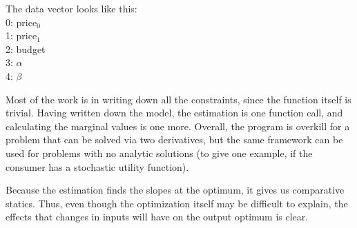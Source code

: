 The data vector looks like this:\\
0:  price$_0$\\
1:  price$_1$\\
2:  budget \\
3:  $\alpha$  \\
4:  $\beta$   
                                                             
Most of the work is in writing down all the constraints, since the
function itself is trivial. Having written down the model, the estimation
is one function call, and calculating the marginal values is one more.
Overall, the program is overkill for a problem that can be solved via
two derivatives, but the same framework can be used for problems with no
analytic solutions (to give one example, if the consumer has a stochastic
utility function).

Because the estimation finds the slopes at the optimum, it gives us
comparative statics. Thus, even though the optimization itself may be
difficult to explain, the effects that changes in inputs will have on
the output optimum is clear.

\startonecol

\endonecol
